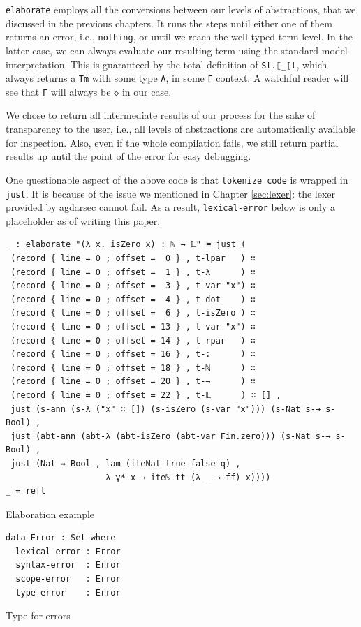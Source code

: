 \verb$elaborate$ employs all the conversions between our levels of abstractions, that we discussed in the previous chapters. It runs the steps until either one of them returns an error, i.e., \verb$nothing$, or until we reach the well-typed term level. In the latter case, we can always evaluate our resulting term using the standard model interpretation. This is guaranteed by the total definition of \verb$St.⟦_⟧t$, which always returns a \verb$Tm$ with some type \verb$A$, in some \verb$Γ$ context. A watchful reader will see that \verb$Γ$ will always be \verb$◇$ in our case.

We chose to return all intermediate results of our process for the sake of transparency to the user, i.e., all levels of abstractions are automatically available for inspection. Also, even if the whole compilation fails, we still return partial results up until the point of the error for easy debugging.

One questionable aspect of the above code is that \verb$tokenize code$ is wrapped in \verb$just$. It is because of the issue we mentioned in Chapter \ref{sec:lexer}: the lexer provided by agdarsec cannot fail. As a result, \verb$lexical-error$ below is only a placeholder as of writing this paper.

\begin{listing}[H]
\begin{verbatim}
_ : elaborate "(λ x. isZero x) : ℕ → 𝕃" ≡ just (
 (record { line = 0 ; offset =  0 } , t-lpar   ) ∷
 (record { line = 0 ; offset =  1 } , t-λ      ) ∷
 (record { line = 0 ; offset =  3 } , t-var "x") ∷
 (record { line = 0 ; offset =  4 } , t-dot    ) ∷
 (record { line = 0 ; offset =  6 } , t-isZero ) ∷
 (record { line = 0 ; offset = 13 } , t-var "x") ∷
 (record { line = 0 ; offset = 14 } , t-rpar   ) ∷
 (record { line = 0 ; offset = 16 } , t-:      ) ∷
 (record { line = 0 ; offset = 18 } , t-ℕ      ) ∷
 (record { line = 0 ; offset = 20 } , t-→      ) ∷
 (record { line = 0 ; offset = 22 } , t-𝕃      ) ∷ [] ,
 just (s-ann (s-λ ("x" ∷ []) (s-isZero (s-var "x"))) (s-Nat s-→ s-Bool) ,
 just (abt-ann (abt-λ (abt-isZero (abt-var Fin.zero))) (s-Nat s-→ s-Bool) ,
 just (Nat ⇒ Bool , lam (iteNat true false q) ,
                    λ γ* x → iteℕ tt (λ _ → ff) x))))
_ = refl
\end{verbatim}
\caption{Elaboration example}
\label{code:elab-ex}
\end{listing}

\begin{listing}[H]
\begin{verbatim}
data Error : Set where
  lexical-error : Error
  syntax-error  : Error
  scope-error   : Error
  type-error    : Error
\end{verbatim}
\caption{Type for errors}
\label{code:elab-error}
\end{listing}

